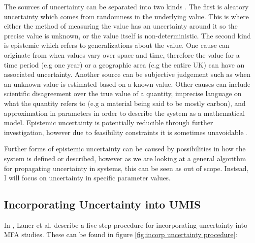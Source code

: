 \documentclass[ %
                    author={Tom Jager},
                supervisor={Dr. Daniel Schien},
                    degree={MEng},
                     title={A Bayesian Inference Engine for UMIS Structured Data},
                  subtitle={},
                      type={research},
                      year={2019} ]{dissertation}
\begin{document}
The sources of uncertainty can be separated into two kinds \cite{ferson1996different}. The first is aleatory uncertainty which comes from randomness in the underlying value. This is where either the method of measuring the value has an uncertainty around it so the precise value is unknown, or the value itself is non-deterministic. The second kind is epistemic which refers to generalizations about the value. One cause can originate from when values vary over space and time, therefore the value for a time period (e.g one year) or a geographic area (e.g the entire UK) can have an associated uncertainty. Another source can be subjective judgement such as when an unknown value is estimated based on a known value. Other causes can include scientific disagreement over the true value of a quantity, imprecise language on what the quantity refers to (e.g a material being said to be mostly carbon), and approximation in parameters in order to describe the system as a mathematical model. Epistemic uncertainty is potentially reducible through further investigation, however due to feasibility constraints it is sometimes unavoidable \cite{laner2014systematic}.

Further forms of epistemic uncertainty can be caused by possibilities in how the system is defined or described, however as we are looking at a general algorithm for propagating uncertainty in systems, this can be seen as out of scope. Instead, I will focus on uncertainty in specific parameter values.

\subsection{Incorporating Uncertainty into UMIS}
In \cite{laner2014systematic}, Laner et al. describe a five step procedure for incorporating uncertainty into MFA studies. These can be found in figure \ref{fig:incorp uncertainty procedure}:
\end{document}
